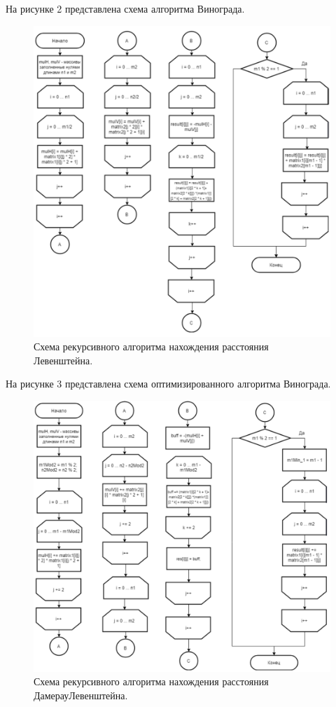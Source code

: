 \documentclass[a4paper,12pt]{article}
\begin{document}
	На рисунке 2 представлена схема алгоритма Винограда.
	\begin{figure}[H]
		\centering
		\includegraphics{vinograd.png}
		\captionsetup{justification=centering}
		\caption{Схема рекурсивного алгоритма нахождения расстояния Левенштейна.}
		\label{Рис 2}
	\end{figure}
	На рисунке 3 представлена схема оптимизированного алгоритма Винограда.
	\begin{figure}[H]
		\centering
		\includegraphics{optimizedvinograd.png}
		\captionsetup{justification=centering}
		\caption{Схема рекурсивного алгоритма нахождения расстояния ДамерауЛевенштейна.}
		\label{Рис 3}
	\end{figure}
	\newpage
\end{document}
